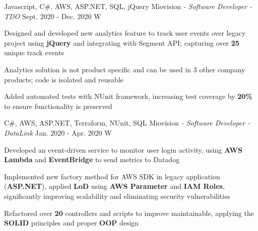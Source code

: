 \begin{siderules}
  \begin{cventries}
    \cventry
    {Javascript, C\#, AWS, ASP.NET, SQL, jQuery}
    {Miovision\hspace{0.15em} \bodyfontlight\itshape{- Software Developer - TDO}}
    {Sept. 2020 - Dec. 2020}
    {W}
    {
      \begin{cvitems}
        \item {Designed and developed new analytics feature to track user events over legacy project using \textbf{jQuery} and integrating with Segment API; capturing over \textbf{25} unique track events}
        \item {Analytics solution is not product specific and can be used in 3 other company products; code is isolated and reusable}
        \item {Added automated tests with NUnit framework, increasing test coverage by \textbf{20\%} to ensure functionality is preserved}
      \end{cvitems}
    }
    \cventry
    {C\#, AWS, ASP.NET, Terraform, NUnit, SQL}
    {Miovision\hspace{0.15em} \bodyfontlight\itshape{- Software Developer - DataLink}}
    {Jan. 2020 - Apr. 2020}
    {W}
    {
      \begin{cvitems}
        \item {Developed an event-driven service to monitor user login activity, using \textbf{AWS Lambda} and \textbf{EventBridge} to send metrics to Datadog}
        \item {Implemented new factory method for AWS SDK in legacy application (\textbf{ASP.NET}), applied \textbf{LoD} using \textbf{AWS Parameter} and \textbf{IAM Roles}, significantly improving scalability and eliminating security vulnerabilities}
        \item {Refactored over \textbf{20} controllers and scripts to improve maintainable, applying the \textbf{SOLID} principles and proper \textbf{OOP} design}

\end{cvitems}}
\end{cventries}
\end{siderules}
